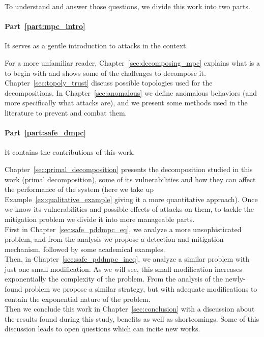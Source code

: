 \documentclass[../main.tex]{subfiles}
\begin{document}
To understand and answer those questions, we divide this work into two parts.

\paragraph{Part~\ref{part:mpc_intro}} It serves as a gentle introduction to attacks in the \dmpc{} context.

For a more unfamiliar reader, Chapter~\ref{sec:decomposing_mpc} explains what is a \mpc{} to begin with and shows some of the challenges to decompose it.
Chapter~\ref{sec:topoly_trust} discuss possible topologies used for the decompositions.
In Chapter~\ref{sec:anomalous} we define anomalous behaviors (and more specifically what attacks are), and we present some methods used in the literature to prevent and combat them.

\paragraph{Part~\ref{part:safe_dmpc}} It contains the contributions of this work.

Chapter~\ref{sec:primal_decomposition} presents the decomposition studied in this work (primal decomposition), some of its vulnerabilities and how they can affect the performance of the system (here we take up Example~\ref{ex:qualitative_example} giving it a more quantitative approach).
Once we know its vulnerabilities and possible effects of attacks on them, to tackle the mitigation problem we divide it into more manageable parts.
\\ First in Chapter~\ref{sec:safe_pddmpc_eq}, we analyze a more unsophisticated problem, and from the analysis we propose a detection and mitigation mechanism, followed by some academical examples.
\\Then, in Chapter~\ref{sec:safe_pddmpc_ineq}, we analyze a similar problem with just one small modification. As we will see, this small modification increases exponentially the complexity of the problem.
From the analysis of the newly-found problem we propose a similar strategy, but with adequate modifications to contain the exponential nature of the problem.
\\Then we conclude this work in Chapter~\ref{sec:conclusion} with a discussion about the results found during this study, benefits as well as shortcomings. Some of this discussion leads to open questions which can incite new works.
\end{document}
